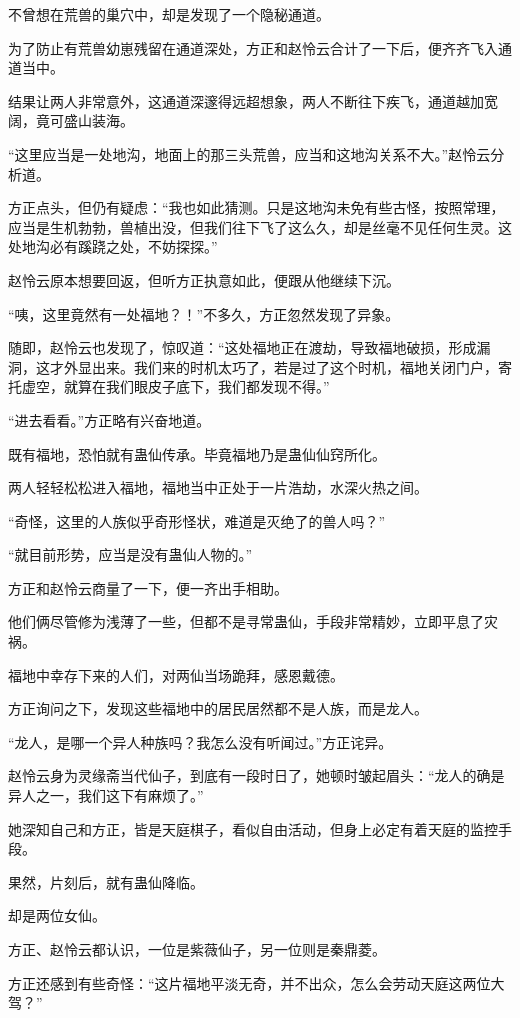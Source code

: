 \begin{this_body}
不曾想在荒兽的巢穴中，却是发现了一个隐秘通道。

为了防止有荒兽幼崽残留在通道深处，方正和赵怜云合计了一下后，便齐齐飞入通道当中。

结果让两人非常意外，这通道深邃得远超想象，两人不断往下疾飞，通道越加宽阔，竟可盛山装海。

“这里应当是一处地沟，地面上的那三头荒兽，应当和这地沟关系不大。”赵怜云分析道。

方正点头，但仍有疑虑：“我也如此猜测。只是这地沟未免有些古怪，按照常理，应当是生机勃勃，兽植出没，但我们往下飞了这么久，却是丝毫不见任何生灵。这处地沟必有蹊跷之处，不妨探探。”

赵怜云原本想要回返，但听方正执意如此，便跟从他继续下沉。

“咦，这里竟然有一处福地？！”不多久，方正忽然发现了异象。

随即，赵怜云也发现了，惊叹道：“这处福地正在渡劫，导致福地破损，形成漏洞，这才外显出来。我们来的时机太巧了，若是过了这个时机，福地关闭门户，寄托虚空，就算在我们眼皮子底下，我们都发现不得。”

“进去看看。”方正略有兴奋地道。

既有福地，恐怕就有蛊仙传承。毕竟福地乃是蛊仙仙窍所化。

两人轻轻松松进入福地，福地当中正处于一片浩劫，水深火热之间。

“奇怪，这里的人族似乎奇形怪状，难道是灭绝了的兽人吗？”

“就目前形势，应当是没有蛊仙人物的。”

方正和赵怜云商量了一下，便一齐出手相助。

他们俩尽管修为浅薄了一些，但都不是寻常蛊仙，手段非常精妙，立即平息了灾祸。

福地中幸存下来的人们，对两仙当场跪拜，感恩戴德。

方正询问之下，发现这些福地中的居民居然都不是人族，而是龙人。

“龙人，是哪一个异人种族吗？我怎么没有听闻过。”方正诧异。

赵怜云身为灵缘斋当代仙子，到底有一段时日了，她顿时皱起眉头：“龙人的确是异人之一，我们这下有麻烦了。”

她深知自己和方正，皆是天庭棋子，看似自由活动，但身上必定有着天庭的监控手段。

果然，片刻后，就有蛊仙降临。

却是两位女仙。

方正、赵怜云都认识，一位是紫薇仙子，另一位则是秦鼎菱。

方正还感到有些奇怪：“这片福地平淡无奇，并不出众，怎么会劳动天庭这两位大驾？”


\end{this_body}
